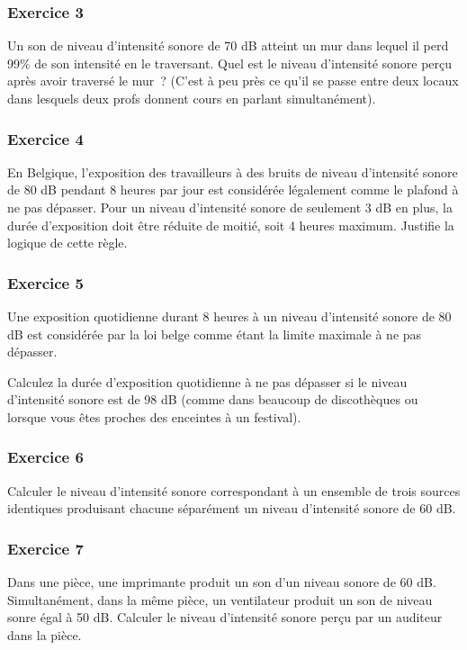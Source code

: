 \subsubsection{Exercice 3}

Un son de niveau d'intensité sonore de 70 dB atteint un mur dans
lequel il perd 99\% de son intensité en le traversant. Quel est le
niveau d'intensité sonore perçu après avoir traversé le mur~? (C'est à
peu près ce qu'il se passe entre deux locaux dans lesquels deux profs
donnent cours en parlant simultanément).

\subsubsection{Exercice 4}
En Belgique, l'exposition des travailleurs à des bruits de niveau
d'intensité sonore de 80 dB pendant 8 heures par jour est considérée
légalement comme le plafond à ne pas dépasser. Pour un niveau
d'intensité sonore de seulement 3 dB en plus, la durée d'exposition doit
être réduite de moitié, soit 4 heures maximum. Justifie la logique de
cette règle.

\subsubsection{Exercice 5}
 Une exposition quotidienne durant 8 heures à un niveau d'intensité
sonore de 80 dB est considérée par la loi belge comme étant la limite
maximale à ne pas dépasser.

Calculez la durée d'exposition quotidienne à ne pas dépasser si le
niveau d'intensité sonore est de 98 dB (comme dans beaucoup de
discothèques ou lorsque vous êtes proches des enceintes à un festival).

\subsubsection{Exercice 6}

Calculer le niveau d'intensité sonore correspondant à un ensemble de
trois sources identiques produisant chacune séparément un niveau
d'intensité sonore de 60 dB.

\subsubsection{Exercice 7}
Dans une pièce, une imprimante produit un son d'un niveau sonore de
60 dB. Simultanément, dans la même pièce, un ventilateur produit un son
de niveau sonre égal à 50 dB. Calculer le niveau d'intensité sonore
perçu par un auditeur dans la pièce.

